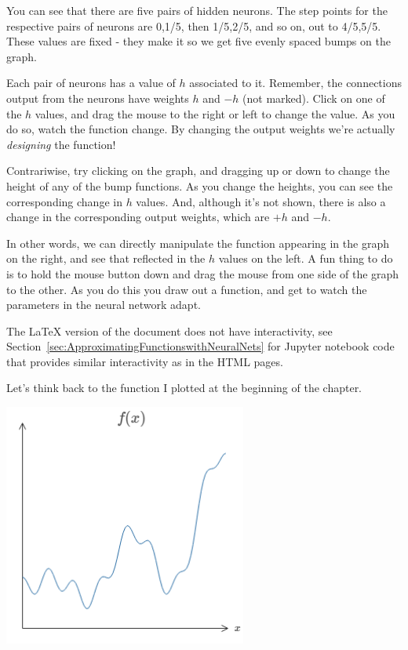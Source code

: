 You can see that there are five pairs of hidden neurons. The step points for the respective pairs of neurons are 0,1/5, then 1/5,2/5, and so on, out to 4/5,5/5. These values are fixed - they make it so we get five evenly spaced bumps on the graph.

Each pair of neurons has a value of $h$ associated to it. Remember, the connections output from the neurons have weights $h$ and $-h$ (not marked). Click on one of the $h$
values, and drag the mouse to the right or left to change the value. As you do so, watch the function change. By changing the output weights we're actually \textit{designing} the function!

Contrariwise, try clicking on the graph, and dragging up or down to change the height of any of the bump functions. As you change the heights, you can see the corresponding change in $h$ values. And, although it's not shown, there is also a change in the corresponding output weights, which are $+h$ and $-h$.

In other words, we can directly manipulate the function appearing in the graph on the right, and see that reflected in the $h$ values on the left. A fun thing to do is to hold the mouse button down and drag the mouse from one side of the graph to the other. As you do this you draw out a function, and get to watch the parameters in the neural network adapt.


The \LaTeX{} version of the document  does not have interactivity, see Section~\ref{sec:ApproximatingFunctionswithNeuralNets} for Jupyter notebook code that provides similar interactivity as in the HTML pages.

Let's think back to the function I plotted at the beginning of the chapter.

{\centering \includegraphics[width=0.6\textwidth,]{pic/wigglyfn17} \par}

